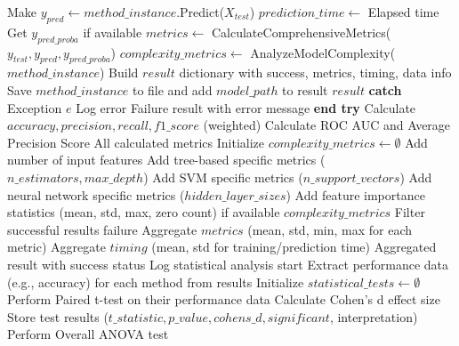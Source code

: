 \begin{algorithm}[!htbp]
\begin{algorithmic}[1]
        \State Make $y_{pred} \leftarrow method\_instance$.Predict($X_{test}$)
        \State $prediction\_time \leftarrow$ Elapsed time
        \State Get $y_{pred\_proba}$ if available
        \State $metrics \leftarrow$ CalculateComprehensiveMetrics($y_{test}, y_{pred}, y_{pred\_proba}$)
        \State $complexity\_metrics \leftarrow$ AnalyzeModelComplexity($method\_instance$)
        \State Build $result$ dictionary with success, metrics, timing, data info
         Save $method\_instance$ to file and add $model\_path$ to result \EndIf
        \Return $result$
    \State \textbf{catch} {Exception $e$}
        \State Log error
        \Return Failure result with error message
    \State \textbf{end try}
\EndProcedure
\Statex
{}
    \State Calculate $accuracy, precision, recall, f1\_score$ (weighted)
        \State Calculate ROC AUC and Average Precision Score
    \EndIf
    \Return All calculated metrics
\EndFunction
\Statex
{}
    \State Initialize $complexity\_metrics \leftarrow \emptyset$
    \State Add number of input features
    \State Add tree-based specific metrics ($n\_estimators, max\_depth$)
    \State Add SVM specific metrics ($n\_support\_vectors$)
    \State Add neural network specific metrics ($hidden\_layer\_sizes$)
    \State Add feature importance statistics (mean, std, max, zero count) if available
    \Return $complexity\_metrics$
\EndFunction
\Statex
{}
    \State Filter successful results
     \Return failure \EndIf
    \State Aggregate $metrics$ (mean, std, min, max for each metric)
    \State Aggregate $timing$ (mean, std for training/prediction time)
    \Return Aggregated result with success status
\EndProcedure
\Statex
{}
    \State Log statistical analysis start
    \State Extract performance data (e.g., accuracy) for each method from results
    \State Initialize $statistical\_tests \leftarrow \emptyset$
            \State Perform Paired t-test on their performance data
            \State Calculate Cohen's d effect size
            \State Store test results ($t\_statistic, p\_value, cohens\_d, significant$, interpretation)
        \EndIf
    \EndFor
        \State Perform Overall ANOVA test

\end{algorithmic}
\end{algorithm}
